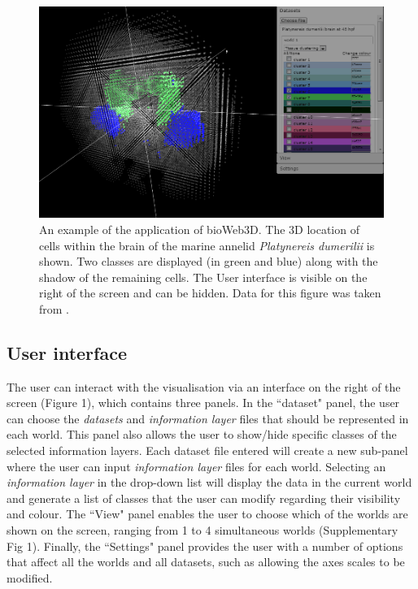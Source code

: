 \documentclass{bioinfo}
\begin{document}
\begin{figure}[h!]%
\centerline{\includegraphics[totalheight=0.18\textheight]{fig1.png}}
\caption{An example of the application of bioWeb3D. The 3D location of cells within the brain of the marine annelid {\it{Platynereis dumerilii}} is shown. Two classes are displayed (in green and blue) along with the shadow of the remaining cells. The User interface is visible on the right of the screen and can be hidden. Data for this figure was taken from \citep{Tomer10}.}\label{fig:01}
\end{figure}

\subsection{User interface}
The user can interact with the visualisation via an interface on the right of the screen (Figure 1), which contains three panels. In the ``dataset" panel, the user can choose the {\it{datasets}} and {\it{information layer}} files that should be represented in each world. This panel also allows the user to show/hide specific classes of the selected information layers. Each dataset file entered will create a new sub-panel where the user can input {\it{information layer}} files for each world. Selecting an {\it{information layer}} in the drop-down list will display the data in the current world and generate a list of classes that the user can modify regarding their visibility and colour. The ``View" panel enables the user to choose which of the worlds are shown on the screen, ranging from 1 to 4 simultaneous worlds (Supplementary Fig 1). Finally, the ``Settings" panel provides the user with a number of options that affect all the worlds and all datasets, such as allowing the axes scales to be modified.
\end{document}

